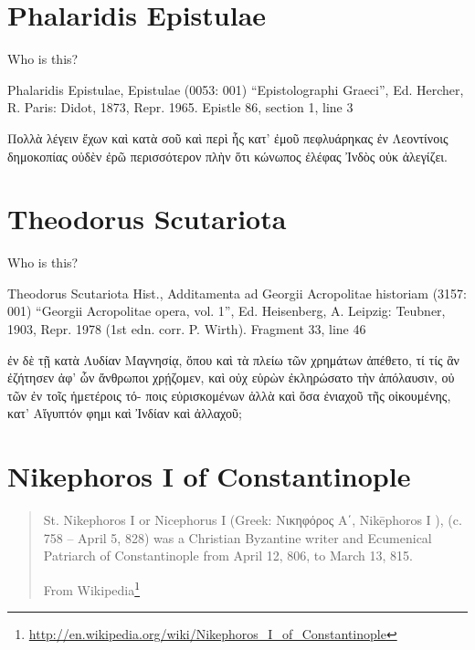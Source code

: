 \documentclass[12pt,letterpaper,twoside,final]{memoir}
\begin{document}
\section{Phalaridis Epistulae}%
Who is this?
\begin{greek}

Phalaridis Epistulae, Epistulae (0053: 001)
“Epistolographi Graeci”, Ed. Hercher, R.
Paris: Didot, 1873, Repr. 1965.
Epistle 86, section 1, line 3

Πολλὰ λέγειν ἔχων καὶ κατὰ σοῦ καὶ περὶ ἧς κατ' 
ἐμοῦ πεφλυάρηκας ἐν Λεοντίνοις δημοκοπίας οὐδὲν   
ἐρῶ περισσότερον πλὴν ὅτι κώνωπος ἐλέφας Ἰνδὸς οὐκ 
ἀλεγίζει. 

\end{greek}


\section{Theodorus Scutariota}%
Who is this?
\begin{greek}
Theodorus Scutariota Hist., Additamenta ad Georgii Acropolitae historiam (3157: 001)
“Georgii Acropolitae opera, vol. 1”, Ed. Heisenberg, A.
Leipzig: Teubner, 1903, Repr. 1978 (1st edn. corr. P. Wirth).
Fragment 33, line 46

                                    ἐν δὲ τῇ κατὰ Λυδίαν 
Μαγνησίᾳ, ὅπου καὶ τὰ πλείω τῶν χρημάτων ἀπέθετο, τί 
τίς ἂν ἐζήτησεν ἀφ' ὧν ἄνθρωποι χρῄζομεν, καὶ οὐχ εὑρὼν 
ἐκληρώσατο τὴν ἀπόλαυσιν, οὐ τῶν ἐν τοῖς ἡμετέροις τό-
ποις εὑρισκομένων ἀλλὰ καὶ ὅσα ἐνιαχοῦ τῆς οἰκουμένης, 
κατ' Αἴγυπτόν φημι καὶ Ἰνδίαν καὶ ἀλλαχοῦ; 
\end{greek}



\section{Nikephoros I of Constantinople}
\blockquote[From Wikipedia\footnote{\url{http://en.wikipedia.org/wiki/Nikephoros_I_of_Constantinople}}]{St. Nikephoros I or Nicephorus I (Greek: Νικηφόρος Α΄, Nikēphoros I ), (c. 758 – April 5, 828) was a Christian Byzantine writer and Ecumenical Patriarch of Constantinople from April 12, 806, to March 13, 815.}
\end{document}
